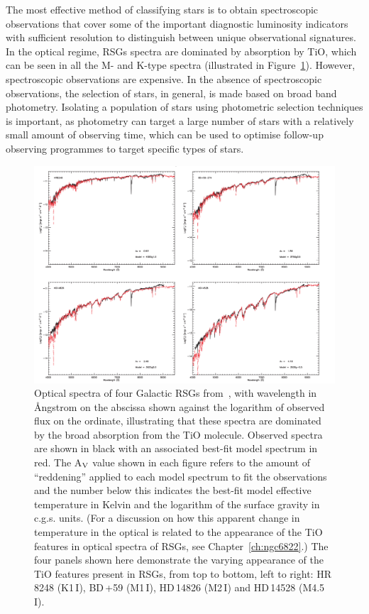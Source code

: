 The most effective method of classifying stars is to obtain spectroscopic observations that cover some of the important diagnostic luminosity indicators with sufficient resolution to distinguish between unique observational signatures.
In the optical regime, RSGs spectra are dominated by absorption by TiO, which can be seen in all the M- and K-type spectra (illustrated in Figure~\ref{fig:RSGoptical}).
However, spectroscopic observations are expensive.
In the absence of spectroscopic observations, the selection of stars, in general, is made based on broad band photometry.
Isolating a population of stars using photometric selection techniques is important, as photometry can target a large number of stars with a relatively small amount of observing time, which can be used to optimise follow-up observing programmes to target specific types of stars.

 \begin{figure}
 \centering
 \includegraphics[width=\textwidth]{intro/Levesque_Fig1}
 \caption[Optical spectra of four RSGs from~\citeauthor{Levesque05}]{Optical spectra of four Galactic RSGs from~\cite{Levesque05}, with wavelength in \AA ngstrom on the abscissa shown against the logarithm of observed flux on the ordinate, illustrating that these spectra are dominated by the broad absorption from the TiO molecule.
 Observed spectra are shown in black with an associated best-fit model spectrum in red.
 The A$_{\rm V}$ value shown in each figure refers to the amount of ``reddening'' applied to each model spectrum to fit the observations and the number below this indicates the best-fit model effective temperature in Kelvin and the logarithm of the surface gravity in c.g.s. units. (For a discussion on how this apparent change in temperature in the optical is related to the appearance of the TiO features in optical spectra of RSGs, see Chapter~\ref{ch:ngc6822}.)
 The four panels shown here demonstrate the varying appearance of the TiO features present in RSGs, from top to bottom, left to right:
 HR\,8248 (K1\,I),
 BD\,+59 (M1\,I),
 HD\,14826 (M2\,I) and
 HD\,14528 (M4.5\,I).
 \label{fig:RSGoptical}}
\end{figure}

